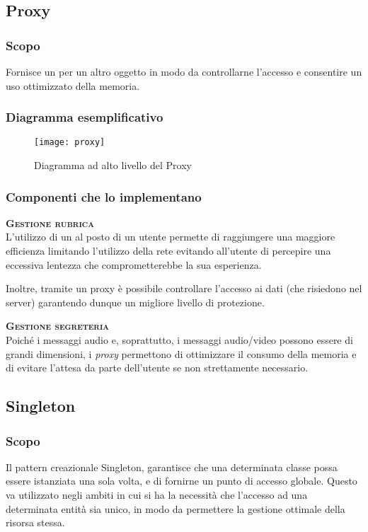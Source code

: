 \subsection{Proxy}

\subsubsection{Scopo}
Fornisce un  per un altro oggetto in modo da controllarne l'accesso e consentire un uso ottimizzato della memoria.

\subsubsection{Diagramma esemplificativo}
\begin{figure}[H]
\centering
\texttt{[image: proxy]}
\caption{Diagramma ad alto livello del  Proxy}\label{fig:proxy}
\end{figure}

\subsubsection{Componenti che lo implementano}
\begin{description}
  \item{\bfseries\scshape Gestione rubrica}\\
L'utilizzo di un  al posto di un utente permette di raggiungere una maggiore efficienza limitando l'utilizzo della rete evitando all'utente di percepire una eccessiva lentezza che comprometterebbe la sua esperienza.

Inoltre, tramite un proxy è possibile controllare l'accesso ai dati (che risiedono nel server) garantendo dunque un migliore livello di protezione.
  \item{\bfseries\scshape Gestione segreteria}\\
Poiché i messaggi audio e, soprattutto, i messaggi audio/video possono essere di grandi dimensioni, i \textit{proxy} permettono di ottimizzare il consumo della memoria e di evitare l'attesa da parte dell'utente se non strettamente necessario.
\end{description}

\subsection{Singleton}

\subsubsection{Scopo}
Il pattern creazionale Singleton, garantisce che una determinata classe possa essere istanziata una sola volta, e di fornirne un punto di accesso globale. Questo  va utilizzato negli ambiti in cui si ha la necessità che l'accesso ad una determinata entità sia unico, in modo da permettere la gestione ottimale della risorsa stessa.

